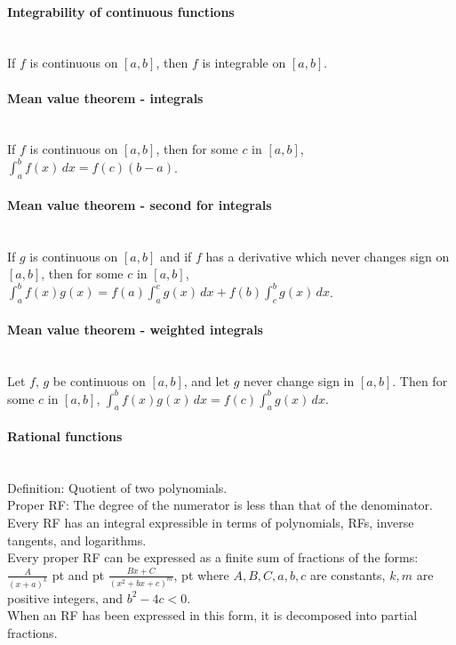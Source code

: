 \documentclass[10pt]{article}
\begin{document}
\paragraph{Integrability of continuous functions}\ \\
If $f$ is continuous on $[a,b]$, then $f$ is integrable on $[a,b]$.

\paragraph{Mean value theorem - integrals}\ \\
If $f$ is continuous on $[a,b]$, then for some $c$ in $[a,b]$,
$\int_a^b f(x)\,dx = f(c)(b-a)$.

\paragraph{Mean value theorem - second for integrals}\ \\
If $g$ is continuous on $[a,b]$ and if $f$ has a derivative which never changes sign on $[a,b]$,
then for some $c$ in $[a,b]$, $\int_a^b f(x)g(x) = f(a)\int_a^c g(x)\,dx + f(b)\int_c^b g(x)\,dx$.

\paragraph{Mean value theorem - weighted integrals}\ \\
Let $f$, $g$ be continuous on $[a,b]$, and let $g$ never change sign in $[a,b]$.
Then for some $c$ in $[a,b]$, $\int_a^b f(x)g(x)\,dx = f(c)\int_a^b g(x)\,dx$.

\paragraph{Rational functions}\ \\
Definition: Quotient of two polynomials.\\
Proper RF: The degree of the numerator is less than that of the denominator.\\
Every RF has an integral expressible in terms of polynomials, RFs, inverse tangents, and logarithms.\\
Every proper RF can be expressed as a finite sum of fractions of the forms:\\
$\frac{A}{(x+a)^k}$  pt and  pt $\frac{Bx + C}{(x^2 + bx + c)^m}$,  pt
where $A, B, C, a, b, c$ are constants, $k, m$ are positive integers, and $b^2 - 4c < 0$.\\
When an RF has been expressed in this form, it is decomposed into partial fractions.
\end{document}
